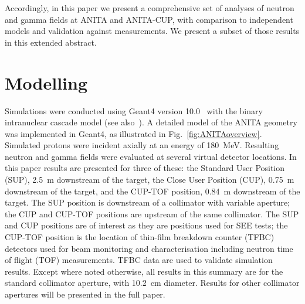 \documentclass[peerreviewca,11pt,a4paper]{IEEEtran}
\begin{document}
Accordingly, in this paper we present a comprehensive set of analyses of neutron and gamma fields at ANITA and ANITA-CUP, with comparison to independent models and validation against measurements.
We present a subset of those results in this extended abstract.

\section{Modelling}
Simulations were conducted using Geant4 version 10.0~\cite{Agostinelli2003,Allison2006} with the binary intranuclear cascade model (see also~\cite{Platt2013}).
A detailed model of the ANITA geometry was implemented in Geant4, as illustrated in Fig.~\ref{fig:ANITAoverview}.
Simulated protons were incident axially at an energy of \SI{180}{\MeV}.
Resulting neutron and gamma fields were evaluated at several virtual detector locations.
In this paper results are presented for three of these: the Standard User Position (SUP), \SI{2.5}{\m} downstream of the target, the Close User Position (CUP), \SI{0.75}{\m} downstream of the target, and the CUP-TOF position, \SI{0.84}{m} downstream of the target.
The SUP position is downstream of a collimator with variable aperture; the CUP and CUP-TOF positions are upstream of the same collimator.
The SUP and CUP positions are of interest as they are positions used for SEE tests; the CUP-TOF position is the location of thin-film breakdown counter (TFBC) detectors used for beam monitoring and characterisation including neutron time of flight (TOF) measurements.
TFBC data are used to validate simulation results.
Except where noted otherwise, all results in this summary are for the standard collimator aperture, with \SI{10.2}{\cm} diameter.
Results for other collimator apertures will be presented in the full paper.
\end{document}

